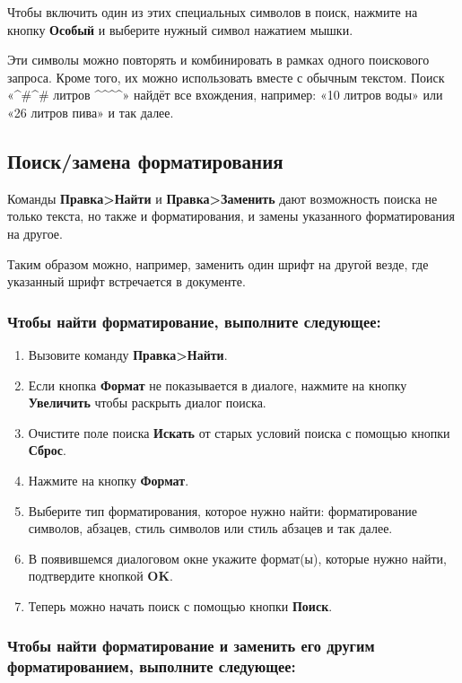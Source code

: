 ﻿\documentclass[a4paper,10pt]{article}
\begin{document}
Чтобы включить один из этих специальных символов в поиск, нажмите на кнопку \textbf{Особый} и выберите нужный символ нажатием мышки.

Эти символы можно повторять и комбинировать в рамках одного поискового запроса. Кроме того, их можно использовать вместе с обычным текстом. Поиск «\textasciicircum\#\textasciicircum\# литров \textasciicircum \textdollar\textasciicircum \textdollar\textasciicircum \textdollar\textasciicircum \textdollar» найдёт все вхождения, например: «10 литров воды» или «26 литров пива» и так далее.

\subsection{Поиск/замена форматирования} \label{sec:поискзаменаформатирования}
Команды \textbf{Правка>Найти} и \textbf{Правка>Заменить} дают возможность поиска не только текста, но также и форматирования, и замены указанного форматирования на другое.

Таким образом можно, например, заменить один шрифт на другой везде, где указанный шрифт встречается в документе.

\subsubsection{Чтобы найти форматирование, выполните следующее:}
\begin{enumerate}
 \item Вызовите команду \textbf{Правка>Найти}.
 \item Если кнопка \textbf{Формат} не показывается в диалоге, нажмите на кнопку \textbf{Увеличить} чтобы раскрыть диалог поиска.
 \item Очистите поле поиска \textbf{Искать} от старых условий поиска с помощью кнопки \textbf{Сброс}.
 \item Нажмите на кнопку \textbf{Формат}.
 \item Выберите тип форматирования, которое нужно найти: форматирование символов, абзацев, стиль символов или стиль абзацев и так далее.
 \item В появившемся диалоговом окне укажите формат(ы), которые нужно найти, подтвердите кнопкой \textbf{OK}.
 \item Теперь можно начать поиск с помощью кнопки \textbf{Поиск}.
\end{enumerate}

\subsubsection{Чтобы найти форматирование и заменить его другим форматированием, выполните следующее:}
\end{document}
